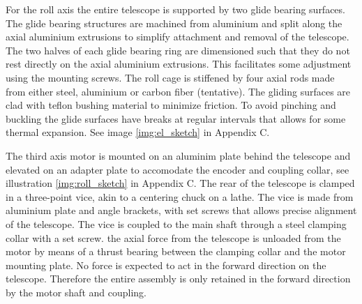 For the roll axis the entire telescope is supported by two glide bearing surfaces. The glide bearing structures are machined from  aluminium and split along the axial aluminium extrusions to simplify attachment and removal of the telescope. The  two halves of each glide bearing ring are dimensioned such that they do not rest directly on the axial aluminium extrusions. This facilitates some adjustment using the mounting screws. The roll cage is stiffened by four axial rods made from either steel, aluminium or carbon fiber (tentative). The gliding surfaces are clad with teflon bushing material to minimize friction. To avoid pinching and buckling the glide surfaces have breaks at regular intervals that allows for some thermal expansion. See image \ref{img:el_sketch} in Appendix C. 

The third axis motor is mounted on an aluminim plate behind the telescope and elevated on an adapter plate to accomodate the encoder and coupling collar, see illustration \ref{img:roll_sketch} in Appendix C. The rear of the telescope is clamped in a three-point vice, akin to a centering chuck on a lathe. The vice is made from aluminium plate and angle brackets, with set screws that allows precise alignment of the telescope. The vice is coupled to the main shaft through a steel clamping collar with a set screw. the axial force from the telescope is unloaded from the motor by means of a thrust bearing between the clamping collar and the motor mounting plate. No force is expected to act in the forward direction on the telescope. Therefore the entire assembly is only retained in the forward direction by the motor shaft and coupling.

